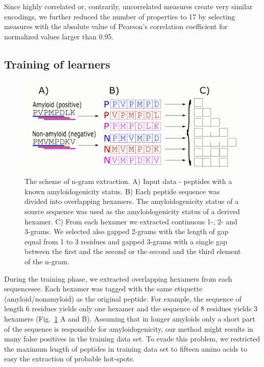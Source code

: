 \documentclass{bioinfo}
\begin{document}
\begin{methods}
  Since highly correlated or, contrarily, uncorrelated measures create very 
similar encodings, we further reduced the number of properties to 17 by 
selecting measures with the absolute value of Pearson's correlation coefficient 
for normalized values larger than 0.95.

\subsection{Training of learners}

\begin{figure}[!tpb]%
\centerline{\includegraphics[width=\textwidth]{figures/ngram_scheme.png}}
  \caption{The scheme of n-gram extraction. A) Input data - peptides with a 
known amyloidogenicity status. B) Each peptide sequence was divided into 
overlapping hexamers. The amyloidogenicity status of a source sequence was used 
as the amyloidogenicity status of a derived hexamer. C) From each hexamer we 
extracted continuous 1-, 2- and 3-grams. We selected also gapped 2-grams with 
the length of gap equal from 1 to 3 residues and gapped 3-grams with a single 
gap between the first and the second or the second and the third element of the 
n-gram.}
\label{fig:ngram_scheme}
\end{figure}

During the training phase, we extracted overlapping hexamers from each 
sequencesee. Each hexamer was tagged with the same etiquette (amyloid/nonamyloid) 
as the original peptide. For example, the sequence of length 6 residues yields 
only one hexamer and the sequence of 8 residues yields 3 hexamers (Fig.~\ref{fig:ngram_scheme} A and B).  Assuming 
that in longer amyloids only a short part of the sequence is responsible for 
amyloidogenicity, our method might results in many false positives in the 
training data set. To evade this problem, we restricted the maximum length of 
peptides in training data set to fifteen amino acids to easy the extraction of 
probable hot-spots.


\end{methods}
\end{document}
